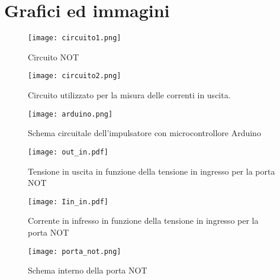 \section{Grafici ed immagini}
\begin{figure}[h]
	\centering
	\texttt{[image: circuito1.png]}
	\caption{Circuito NOT}
	\label{f:circuito1}
\end{figure}
\begin{figure}[h]
	\centering
	\texttt{[image: circuito2.png]}
	\caption{Circuito utilizzato per la misura delle correnti in uscita.}
           \label{f:circuito2}
\end{figure}

\begin{figure}[h]
	\centering
	\texttt{[image: arduino.png]}
	\caption{Schema circuitale dell'impulsatore con microcontrollore Arduino}
           \label{f:Circuito}
\end{figure}

\begin{figure}[h]
	\centering
	\texttt{[image: out\_in.pdf]}
	\caption{Tensione in uscita in funzione della tensione in ingresso per la porta NOT}
           \label{f:out_in}
\end{figure}
\begin{figure}[h]
	\centering
	\texttt{[image: Iin\_in.pdf]}
	\caption{Corrente in infresso in funzione della tensione in ingresso per la porta NOT}
           \label{f:Iin_in}
\end{figure}
\begin{figure}[h]
	\centering
	\texttt{[image: porta\_not.png]}
	\caption{Schema interno della porta NOT}
           \label{f:porta_not}
\end{figure}